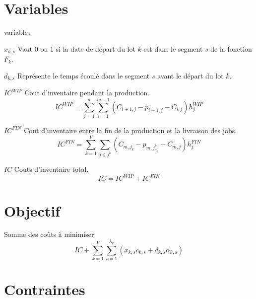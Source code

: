 \section{Variables}

\begin{labeling}{variables}
	\item [$x_{k, s}$]
	Vaut 0 ou 1 si la date de départ du lot $k$ est dans le segment $s$ de la fonction $F_k$.
	\item [$d_{k, s}$]
	Représente le temps écoulé dans le segment $s$ avant le départ du lot $k$.
	\item [$IC^{WIP}$]
	Cout d'inventaire pendant la production.
	$$IC^{WIP}=\sum_{j=1}^{n} \sum_{i=1}^{m-1} \left(C_{i+1, j} - p_{i+1, j} - C_{i,j} \right) h_j^{WIP}$$
	\item [$IC^{FIN}$]
	Cout d'inventaire entre la fin de la production et la livraison des jobs.
	$$IC^{FIN} = \sum_{k=1}^{V} \sum _{j\in j^k} \left(C_{m, j_k} - p_{m, j_{n_k}^k} - C_{m, j} \right) h_j^{FIN}$$
	\item [$IC$]
	Couts d'inventaire total.
	$$IC = IC^{WIP} + IC^{FIN}$$
\end{labeling}


\section{Objectif}
Somme des coûts à minimiser
$$IC + \sum_{k=1}^{V} \sum_{s=1}^{\lambda_k} \left(x_{k, s} c_{k, s}+ d_{k,s} \alpha_{k, s} \right)$$

\section{Contraintes}

